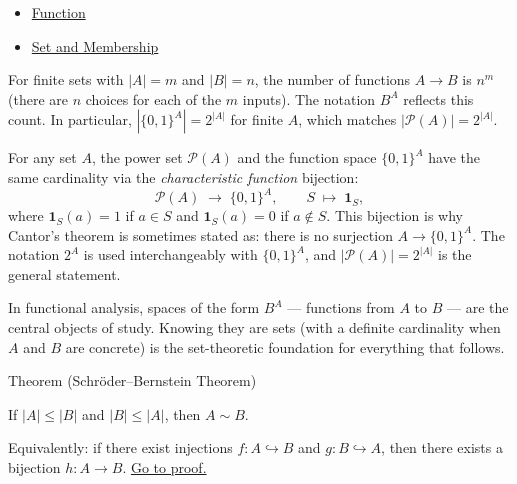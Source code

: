 \begin{dependencies}
\begin{itemize}
  \item \hyperref[def:function]{Function}
  \item \hyperref[def:set-membership]{Set and Membership}
\end{itemize}
\end{dependencies}

\begin{remark*}
For finite sets with $|A| = m$ and $|B| = n$, the number of functions
$A \to B$ is $n^m$ (there are $n$ choices for each of the $m$ inputs).
The notation $B^A$ reflects this count. In particular, $|\{0,1\}^A| = 2^{|A|}$
for finite $A$, which matches $|\mathcal{P}(A)| = 2^{|A|}$.
\end{remark*}

\begin{remark*}
\label{rem:characteristic-fn}
For any set $A$, the power set $\mathcal{P}(A)$ and the function space
$\{0,1\}^A$ have the same cardinality via the \emph{characteristic function}
bijection:
\[
\mathcal{P}(A) \;\to\; \{0,1\}^A,
\qquad
S \;\mapsto\; \mathbf{1}_S,
\]
where $\mathbf{1}_S(a) = 1$ if $a \in S$ and $\mathbf{1}_S(a) = 0$ if
$a \notin S$. This bijection is why Cantor's theorem is sometimes stated as:
there is no surjection $A \to \{0,1\}^A$. The notation $2^A$ is used
interchangeably with $\{0,1\}^A$, and $|\mathcal{P}(A)| = 2^{|A|}$ is
the general statement.

In functional analysis, spaces of the form $B^A$ --- functions from $A$ to
$B$ --- are the central objects of study. Knowing they are sets (with a definite
cardinality when $A$ and $B$ are concrete) is the set-theoretic foundation
for everything that follows.
\end{remark*}


\begin{theorembox}{Theorem (Schr\"{o}der--Bernstein Theorem)}
\begin{theorem}\label{thm:schroder-bernstein}
If $|A| \leq |B|$ and $|B| \leq |A|$, then $A \sim B$.

Equivalently: if there exist injections $f : A \hookrightarrow B$ and
$g : B \hookrightarrow A$, then there exists a bijection $h : A \to B$.
\hyperref[prf:schroder-bernstein]{Go to proof.}
\end{theorem}
\end{theorembox}

